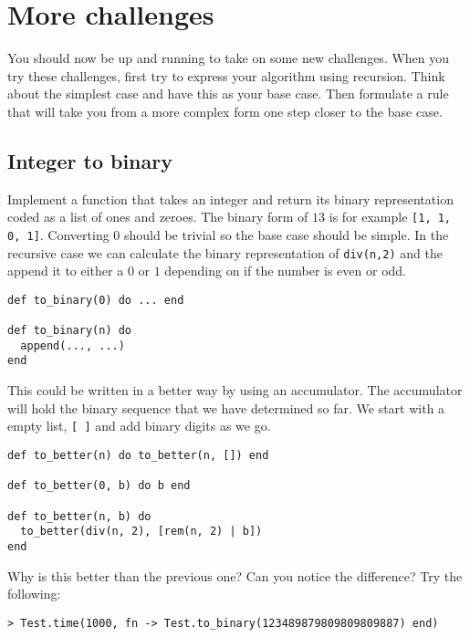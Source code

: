 \documentclass[a4paper,11pt]{article}
\begin{document}

\section{More challenges}

You should now be up and running to take on some new challenges. When
you try these challenges, first try to express your algorithm using
recursion. Think about the simplest case and have this as your base
case. Then formulate a rule that will take you from a more complex form
one step closer to the base case.

\subsection{Integer to binary}

Implement a function that takes an integer and return its binary
representation coded as a list of ones and zeroes. The binary form of
$13$ is for example {\tt [1, 1, 0, 1]}. Converting $0$ should be trivial
so the base case should be simple. In the recursive case we can
calculate the binary representation of {\tt div(n,2)} and the append
it to either a $0$ or $1$ depending on if the number is even or odd.

\begin{verbatim}
def to_binary(0) do ... end

def to_binary(n) do
  append(..., ...)
end
\end{verbatim}

This could be written in a better way by using an accumulator. The
accumulator will hold the binary sequence that we have determined so
far. We start with a empty list, {\tt [ ]} and add binary digits as we go.

\begin{verbatim}
def to_better(n) do to_better(n, []) end

def to_better(0, b) do b end

def to_better(n, b) do
  to_better(div(n, 2), [rem(n, 2) | b])
end
\end{verbatim}

Why is this better than the previous one? Can you notice the difference?  Try the following:

\begin{verbatim}
> Test.time(1000, fn -> Test.to_binary(123489879809809809887) end)
\end{verbatim}
\end{document}
